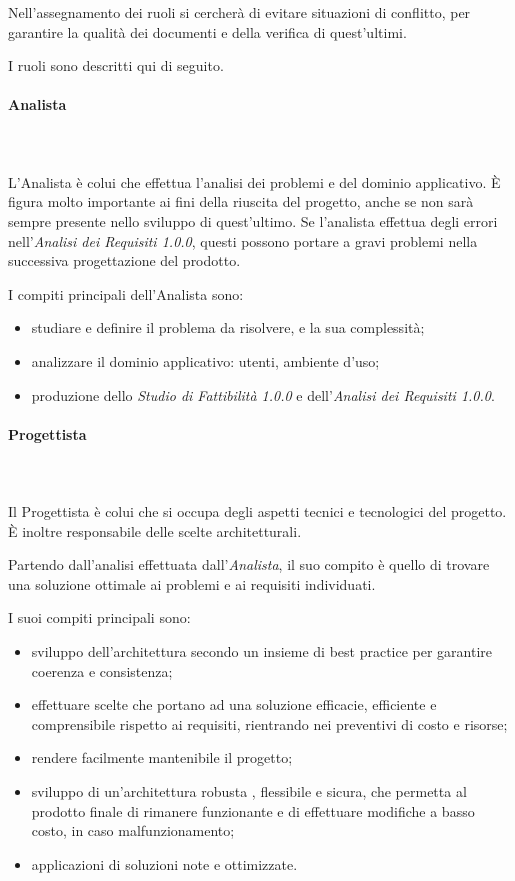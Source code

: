   			Nell'assegnamento dei ruoli si cercherà di evitare situazioni di conflitto, per garantire la qualità dei documenti e della verifica di quest'ultimi. 
   			
   			I ruoli sono descritti qui di seguito.
   			\paragraph{Analista} \mbox{}\\ \mbox{}\\
   				L'Analista è colui che effettua l'analisi dei problemi e del dominio applicativo. \`{E} figura molto importante ai fini della riuscita del progetto, anche se non sarà sempre presente nello sviluppo di quest'ultimo. Se l'analista effettua degli errori nell'\textit{Analisi dei Requisiti 1.0.0}, questi possono portare a gravi problemi nella successiva progettazione del prodotto.
   				
   				I compiti principali dell'Analista sono:
   				\begin{itemize}
   					\item studiare e definire il problema da risolvere, e la sua complessità;
   					\item analizzare il dominio applicativo: utenti, ambiente d'uso;
   					\item produzione dello \textit{Studio di Fattibilità 1.0.0} e  dell'\textit{Analisi dei Requisiti 1.0.0}.
   				\end{itemize}
   			\paragraph{Progettista} \mbox{}\\ \mbox{}\\
   			Il Progettista è colui che si occupa degli aspetti tecnici e tecnologici del progetto. \`{E} inoltre responsabile delle scelte architetturali.
   			
   			Partendo dall'analisi effettuata dall'\textit{Analista}, il suo compito è quello di trovare una soluzione ottimale ai problemi e ai requisiti individuati.
   			
   			I suoi compiti principali sono:
   			\begin{itemize}
   				\item sviluppo dell'architettura secondo un insieme di best practice per garantire coerenza e consistenza;
   				\item effettuare scelte che portano ad una soluzione efficacie, efficiente e comprensibile rispetto ai requisiti, rientrando nei preventivi di costo e risorse;
   				\item rendere facilmente mantenibile il progetto;
   				\item sviluppo di un'architettura robusta , flessibile e sicura, che permetta al prodotto finale di rimanere funzionante e di effettuare modifiche a basso costo, in caso malfunzionamento;
   				\item applicazioni di soluzioni note e ottimizzate.
   			\end{itemize}
